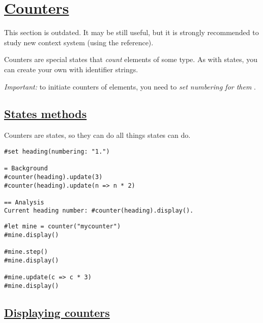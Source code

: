 \section{\texorpdfstring{\hyperref[counters]{Counters}}{Counters}}\label{counters}

This section is outdated. It may be still useful, but it is strongly
recommended to study new context system (using the reference).

Counters are special states that \emph{count} elements of some type. As
with states, you can create your own with identifier strings.

\emph{Important:} to initiate counters of elements, you need to
\emph{set numbering for them} .

\subsection{\texorpdfstring{\hyperref[states-methods]{States
methods}}{States methods}}\label{states-methods}

Counters are states, so they can do all things states can do.

\begin{verbatim}
#set heading(numbering: "1.")

= Background
#counter(heading).update(3)
#counter(heading).update(n => n * 2)

== Analysis
Current heading number: #counter(heading).display().
\end{verbatim}

\pandocbounded{}

\begin{verbatim}
#let mine = counter("mycounter")
#mine.display()

#mine.step()
#mine.display()

#mine.update(c => c * 3)
#mine.display()
\end{verbatim}

\pandocbounded{}

\subsection{\texorpdfstring{\hyperref[displaying-counters]{Displaying
counters}}{Displaying counters}}\label{displaying-counters}

